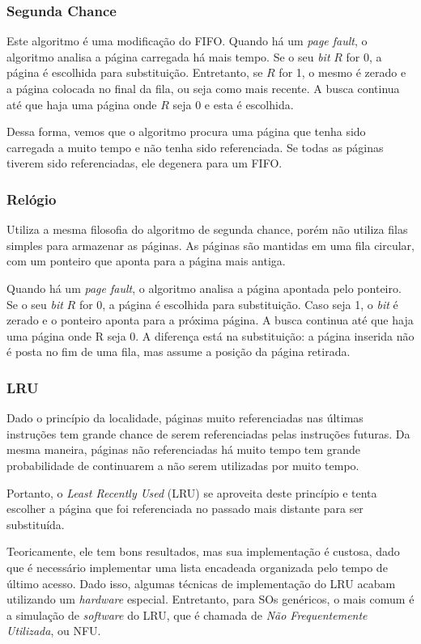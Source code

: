 \subsubsection{Segunda Chance}
Este algoritmo é uma modificação do FIFO. Quando há um \textit{page fault}, o algoritmo analisa a página carregada há mais tempo. Se o seu \textit{bit} $R$ for 0, a página é escolhida para substituição. Entretanto, se $R$ for 1, o mesmo é zerado e a página colocada no final da fila, ou seja como mais recente. A busca continua até que haja uma página onde $R$ seja 0 e esta é escolhida.

Dessa forma, vemos que o algoritmo procura uma página que tenha sido carregada a muito tempo e não tenha sido referenciada. Se todas as páginas tiverem sido referenciadas, ele degenera para um FIFO.


\subsubsection{Relógio}
Utiliza a mesma filosofia do algoritmo de segunda chance, porém não utiliza filas simples para armazenar as páginas. As páginas são mantidas em uma fila circular, com um ponteiro que aponta para a página mais antiga.

Quando há um \textit{page fault}, o algoritmo analisa a página apontada pelo ponteiro. Se o seu \textit{bit} $R$ for 0, a página é escolhida para substituição. Caso seja 1, o \textit{bit} é zerado e o ponteiro aponta para a próxima página. A busca continua até que haja uma página onde R seja 0. A diferença está na substituição: a página inserida não é posta no fim de uma fila, mas assume a posição da página retirada.



\subsubsection{LRU}
Dado o princípio da localidade, páginas muito referenciadas nas últimas instruções tem grande chance de serem referenciadas pelas instruções futuras. Da mesma maneira, páginas não referenciadas há muito tempo tem grande probabilidade de continuarem a não serem utilizadas por muito tempo.

Portanto, o \textit{Least Recently Used} (LRU) se aproveita deste princípio e tenta escolher a página que foi referenciada no passado mais distante para ser substituída.

Teoricamente, ele tem bons resultados, mas sua implementação é custosa, dado que é necessário implementar uma lista encadeada organizada pelo tempo de último acesso. Dado isso, algumas técnicas de implementação do LRU acabam utilizando um \textit{hardware} especial. Entretanto, para SOs genéricos, o mais comum é a simulação de \textit{software} do LRU, que é chamada de \textit{Não Frequentemente Utilizada}, ou NFU.

